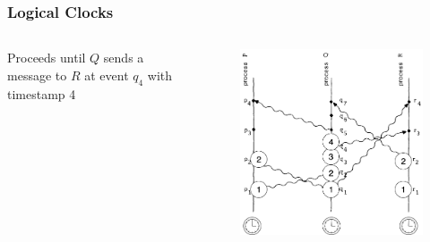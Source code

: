 \documentclass{beamer}
\begin{document}
\frame
{
	\frametitle{Logical Clocks}

	\begin{columns}
	\begin{column}{0.6\textwidth}

		Proceeds until $Q$ sends a message to $R$ at event $q_4$ with timestamp 4


	\end{column}
	\begin{column}{0.4\textwidth}

		\begin{figure}[ht!]
		\includegraphics[width=\textwidth]{files/ClockDist-Impl-Logical-Clock-3.png}
		\end{figure}


	\end{column}
	\end{columns}


}
\end{document}
